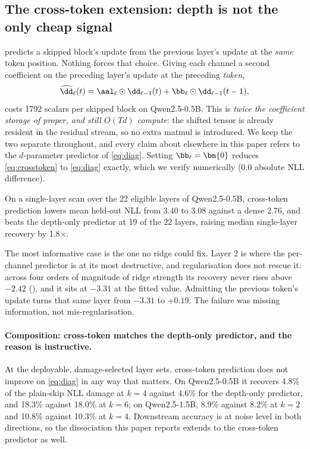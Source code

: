 \subsection{The cross-token extension: depth is not the only cheap signal}
\label{sec:app-crosstoken}

 predicts a skipped block's update from the previous layer's update at the
\emph{same} token position. Nothing forces that choice. Giving each channel a second
coefficient on the preceding layer's update at the preceding \emph{token},
\begin{equation}
\widehat{\dd}_\ell(t) = \aal_\ell \odot \dd_{\ell-1}(t) + \bb_\ell \odot \dd_{\ell-1}(t-1),
\label{eq:crosstoken}
\end{equation}
costs 1792 scalars per skipped block on Qwen2.5-0.5B. This is \emph{twice the
coefficient storage of \mname proper, and still $O(Td)$ compute}: the shifted tensor is
already resident in the residual stream, so no extra matmul is introduced. We keep the two
separate throughout, and every claim about \mname elsewhere in this paper refers to the
$d$-parameter predictor of \cref{eq:diag}. Setting $\bb_\ell = \bm{0}$ reduces
\cref{eq:crosstoken} to \cref{eq:diag} exactly, which we verify numerically (0.0
absolute NLL difference).

On a single-layer scan over the 22 eligible layers of Qwen2.5-0.5B, cross-token
prediction lowers mean held-out NLL from 3.40 to 3.08 against a dense
2.76, and beats the depth-only predictor at 19 of the 22 layers, raising
median single-layer recovery by 1.8$\times$.

The most informative case is the one no ridge could fix. Layer 2 is where the per-channel
predictor is at its most destructive, and regularisation does not rescue it: across four
orders of magnitude of ridge strength its recovery never rises above $-2.42$
(), and it sits at $-3.31$ at the fitted value. Admitting the
previous token's update turns that same layer from $-3.31$ to $+0.19$. The
failure was missing information, not mis-regularisation.

\paragraph{Composition: cross-token matches the depth-only predictor, and the reason is
instructive.} At the deployable, damage-selected layer sets, cross-token prediction does not
improve on \cref{eq:diag} in any way that matters. On Qwen2.5-0.5B it recovers 4.8\%
of the plain-skip NLL damage at $k=4$ against 4.6\% for the depth-only predictor, and
18.3\% against 18.0\% at $k=6$; on Qwen2.5-1.5B, 8.9\% against 8.2\%
at $k=2$ and 10.8\% against 10.3\% at $k=4$. Downstream accuracy is at noise
level in both directions, so the dissociation this paper reports extends to the cross-token
predictor as well.

